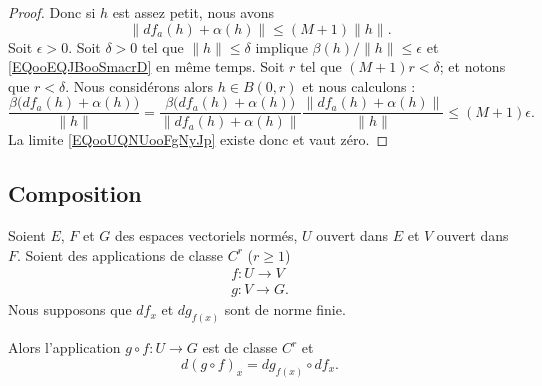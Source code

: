 \begin{proof}
	Donc si \( h\) est assez petit, nous avons
	\begin{equation}        \label{EQooEQJBooSmacrD}
		\| df_a(h)+\alpha(h) \|\leq (M+1)\| h \|.
	\end{equation}
	Soit \( \epsilon>0\). Soit \( \delta>0\) tel que \( \| h \|\leq \delta\) implique \( \beta(h)/\| h \|\leq \epsilon\) et \eqref{EQooEQJBooSmacrD} en même temps. Soit \( r\) tel que \( (M+1)r<\delta\); et notons que \( r<\delta\). Nous considérons alors \( h\in B(0,r)\) et nous calculons :
	\begin{equation}
		\frac{ \beta\big( df_a(h)+\alpha(h) \big) }{ \| h \| }=\frac{ \beta\big( df_a(h)+\alpha(h) \big) }{ \| df_a(h)+\alpha(h) \| }\frac{ \| df_a(h)+\alpha(h) \| }{ \| h \| }\leq (M+1)\epsilon.
	\end{equation}
	La limite \eqref{EQooUQNUooFgNyJp} existe donc et vaut zéro.
\end{proof}

\subsection{Composition}


\begin{theorem}    \label{ThoAGXGuEt}
	Soient \( E\), \( F\) et \( G\) des espaces vectoriels normés, \( U\) ouvert dans \( E\) et \( V\) ouvert dans \( F\). Soient des applications de classe \( C^r\) (\( r\geq 1\))
	\begin{subequations}
		\begin{align}
			f\colon U\to V \\
			g\colon V\to G.
		\end{align}
	\end{subequations}
	Nous supposons que \( df_x\) et \( dg_{f(x)}\) sont de norme finie.

	Alors l'application \( g\circ f\colon U\to G\) est de classe \( C^r\) et
	\begin{equation}\label{EqHFmezmr}
		d(g\circ f)_x=dg_{f(x)}\circ df_x.
	\end{equation}
\end{theorem}

